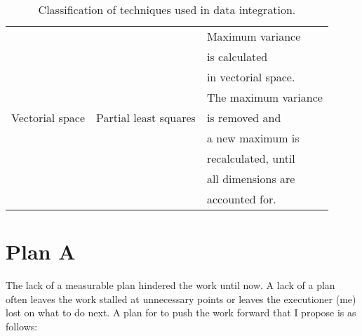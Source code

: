 \documentclass[11pt,a4paper,twoside,openright]{report}
\begin{document}
\begin{table}[hp]
\begin{tabular}{|l|l|l|}
\multirow{9}{0.2\textwidth}{Vectorial space}
& \multirow{9}{0.3\textwidth}{Partial least squares\cite{siongng2013}}
  & Maximum variance \\
& & is calculated \\
& & in vectorial space. \\
\cline{3-3}
& & The maximum variance \\
& & is removed and \\
& & a new maximum is \\
& & recalculated, until \\
& & all dimensions are \\
& & accounted for. \\

\bottomrule
\end{tabular}
\caption{Classification of techniques used in data integration.}
\label{tab:tech}
\end{table}

\clearpage{\pagestyle{empty}\cleardoublepage}



\appendix

\clearpage{\pagestyle{empty}\cleardoublepage}
\chapter{Plan A}

The lack of a measurable plan hindered the work until now.  A lack of a plan
often leaves the work stalled at unnecessary points or leaves the executioner
(me) lost on what to do next.  A plan for to push the work forward that I
propose is as follows:
\end{document}
